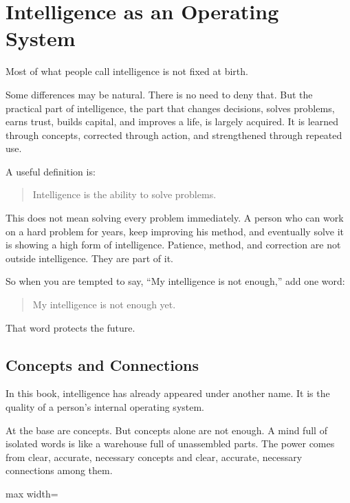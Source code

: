 \chapter{Intelligence as an Operating System}

Most of what people call intelligence is not fixed at birth.

Some differences may be natural. There is no need to deny that. But the practical part of intelligence, the part that changes decisions, solves problems, earns trust, builds capital, and improves a life, is largely acquired. It is learned through concepts, corrected through action, and strengthened through repeated use.

A useful definition is:

\begin{quote}
Intelligence is the ability to solve problems.
\end{quote}

This does not mean solving every problem immediately. A person who can work on a hard problem for years, keep improving his method, and eventually solve it is showing a high form of intelligence. Patience, method, and correction are not outside intelligence. They are part of it.

So when you are tempted to say, ``My intelligence is not enough,'' add one word:

\begin{quote}
My intelligence is not enough yet.
\end{quote}

That word protects the future.

\section*{Concepts and Connections}

In this book, intelligence has already appeared under another name. It is the quality of a person's internal operating system.

At the base are concepts. But concepts alone are not enough. A mind full of isolated words is like a warehouse full of unassembled parts. The power comes from clear, accurate, necessary concepts and clear, accurate, necessary connections among them.

\begin{center}
\begin{adjustbox}{max width=\linewidth}
\end{adjustbox}
\end{center}

